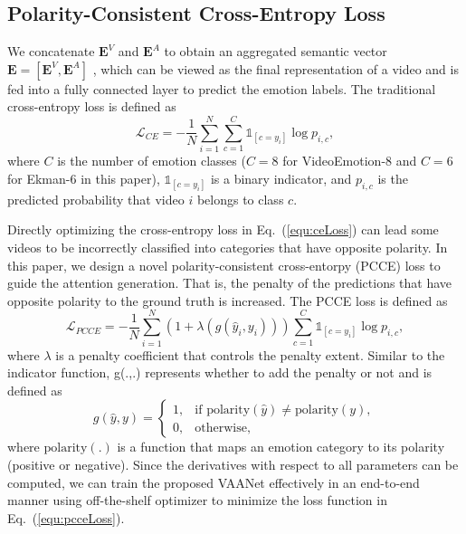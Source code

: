 \documentclass[letterpaper]{article} \usepackage{aaai20}  \usepackage{times}  \usepackage{helvet} \usepackage{courier}  \usepackage[hyphens]{url}  \usepackage{graphicx} \urlstyle{rm} \def\UrlFont{\rm}  \usepackage{graphicx}
\begin{document}
\subsection{Polarity-Consistent Cross-Entropy Loss}
\label{ssec:PCCE}
We concatenate $\textbf{E}^V$ and $\textbf{E}^A$ to obtain an aggregated semantic vector $\textbf{E} = [\textbf{E}^V, \textbf{E}^A]$ , which can be viewed as the final representation of a video and is fed into a fully connected layer to predict the emotion labels. The traditional cross-entropy loss is defined as
\begin{equation}{\mathcal{L}_{CE}} =  - \frac{1}{N}\sum\limits_{i = 1}^N {\sum\limits_{c = 1}^C {\mathds{1}_{[c=y_i]}\log p_{i, c}} },
\label{equ:ceLoss}
\end{equation}
where $C$ is the number of emotion classes ($C=8$ for VideoEmotion-8 and $C=6$ for Ekman-6 in this paper), $\mathds{1}_{[c=y_i]}$ is a binary indicator, and $p_{i, c}$ is the predicted probability that video $i$ belongs to class $c$.





Directly optimizing the cross-entropy loss in Eq.~(\ref{equ:ceLoss}) can lead some videos to be incorrectly classified into categories that have opposite polarity.
In this paper, we design a novel polarity-consistent cross-entorpy (PCCE) loss to guide the attention generation. That is, the penalty of the predictions that have opposite polarity to the ground truth is increased. The PCCE loss is defined as
\begin{equation}{\mathcal{L}_{PCCE}} =  - \frac{1}{N}\sum\limits_{i = 1}^N  (1 + \lambda (g({\hat{y}_i, y_i}))) {\sum\limits_{c = 1}^C {\mathds{1}_{[c=y_i]}\log {p_{i,c}}} },
\label{equ:pcceLoss}
\end{equation}
where $\lambda$ is a penalty coefficient that controls the penalty extent. Similar to the indicator function, g(.,.) represents whether to add the penalty or not and is defined as
\begin{equation}g(\hat{y},y)=\begin{cases}
1, & \text{if } \text{polarity}(\hat{y})\neq \text{polarity}(y),\\
0, & \text{otherwise},
\end{cases}
\label{equ:indicator}
\end{equation}
where $\text{polarity}(.)$ is a function that maps an emotion category to its polarity (positive or negative). Since the derivatives with respect to all parameters can be computed, we can train the proposed VAANet effectively in an end-to-end manner using off-the-shelf optimizer to minimize the loss function in Eq.~(\ref{equ:pcceLoss}).
\end{document}
